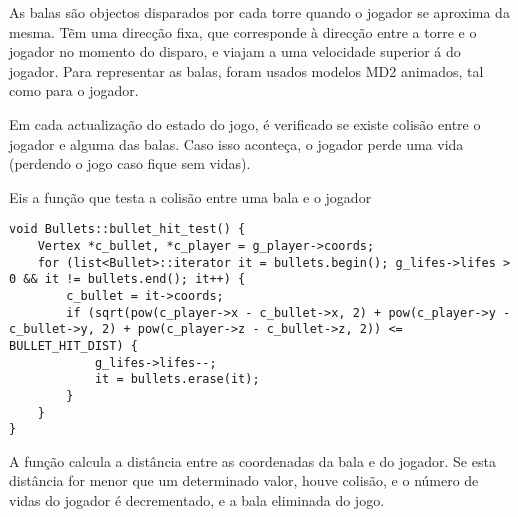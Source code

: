 As balas são objectos disparados por cada torre quando o jogador se aproxima da mesma.
Tẽm uma direcção fixa, que corresponde à direcção entre a torre e o jogador no momento do disparo, e viajam a uma velocidade superior á do jogador.
Para representar as balas, foram usados modelos MD2 animados, tal como para o jogador.

Em cada actualização do estado do jogo, é verificado se existe colisão entre o jogador e alguma das balas. Caso isso aconteça, o jogador perde uma vida (perdendo o jogo caso fique sem vidas).

Eis a função que testa a colisão entre uma bala e o jogador

\begin{lstlisting}
void Bullets::bullet_hit_test() {
    Vertex *c_bullet, *c_player = g_player->coords;
    for (list<Bullet>::iterator it = bullets.begin(); g_lifes->lifes > 0 && it != bullets.end(); it++) {
        c_bullet = it->coords;
        if (sqrt(pow(c_player->x - c_bullet->x, 2) + pow(c_player->y - c_bullet->y, 2) + pow(c_player->z - c_bullet->z, 2)) <= BULLET_HIT_DIST) {
            g_lifes->lifes--;
			it = bullets.erase(it);
        }
    }
}
\end{lstlisting}

A função calcula a distância entre as coordenadas da bala e do jogador. Se esta distância for menor que um determinado valor, houve colisão, e o número de vidas do jogador é decrementado, e a bala eliminada do jogo.
